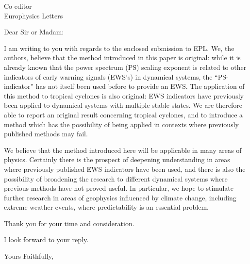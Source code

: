 \documentclass{letter}
\begin{document}
\begin{letter}{Co-editor \\ Europhysics Letters}
\opening{Dear Sir or Madam:}

I am writing to you with regards to the enclosed submission to EPL. We, the authors, believe that the method introduced in this paper is original: while it is already known that the power spectrum (PS) scaling exponent is related to other indicators of early warning signals (EWS's) in dynamical systems, the ``PS-indicator'' has not itself been used before to provide an EWS. The application of this method to tropical cyclones is also original: EWS indicators have previously been applied to dynamical systems with multiple stable states. We are therefore able to report an original result concerning tropical cyclones, and to introduce a method which has the possibility of being applied in contexts where previously published methods may fail.

We believe that the method introduced here will be applicable in many areas of physics. Certainly there is the prospect of deepening understanding in areas where previously published EWS indicators have been used, and there is also the possibility of broadening the research to different dynamical systems where previous methods have not proved useful. In particular, we hope to stimulate further research in areas of geophysics influenced by climate change, including extreme weather events, where predictability is an essential problem.

Thank you for your time and consideration.

I look forward to your reply.

\closing{Yours Faithfully,}


\end{letter}
\end{document}
